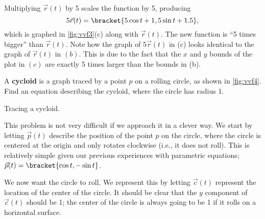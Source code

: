\begin{example}
Multiplying $\vec r(t)$ by 5 scales the function by 5, producing
\[5\vec r(t) =\bracket{5\cos t+1,5\sin t+1.5},\]
which is graphed in \autoref{fig:vvf3}(c) along with $\vec r(t)$. The new function is ``5 times bigger'' than $\vec r(t)$. Note how the graph of $5\vec r(t)$ in (c) looks identical to the graph of $\vec r(t)$ in $(b)$. This is due to the fact that the $x$ and $y$ bounds of the plot in $(c)$ are exactly 5 times larger than the bounds in (b).
\end{example}

\begin{example}\label{ex_vvf4}
A \textbf{cycloid} is a graph traced by a point $p$ on a rolling circle, as shown in \autoref{fig:vvf4}. Find an equation describing the cycloid, where the circle has radius 1.
{\centering
{}
\captionsetup{type=figure}
\caption{Tracing a cycloid.}\label{fig:vvf4}
}%
\solution
This problem is not very difficult if we approach it in a clever way. We start by letting $\vec p(t)$ describe the position of the point $p$ on the circle, where the circle is centered at the origin and only rotates clockwise (i.e., it  does not roll). This is relatively simple given our previous experiences with parametric equations; $\vec p(t) =\bracket{\cos t, -\sin t}$. 

We now want the circle to roll. We represent this by letting $\vec c(t)$ represent the location of the center of the circle. It should be clear that the $y$ component of $\vec c(t)$ should be 1; the center of the circle is always going to be 1 if it rolls on a horizontal surface.



\end{example}
